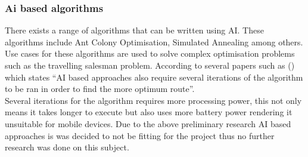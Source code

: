 \subsubsection{Ai based algorithms}
There exists a range of algorithms that can be written using AI. These algorithms include Ant Colony Optimisation, Simulated Annealing among others. Use cases for these algorithms are used to solve complex optimisation problems such as the travelling salesman problem. According to several papers such as (\citetemp \citetemp) which states “AI based approaches also require several iterations of the algorithm to be ran in order to find the more optimum route”.\\
Several iterations for the algorithm requires more processing power, this not only means it takes longer to execute but also uses more battery power rendering it unsuitable for mobile devices. Due to the above preliminary research AI based approaches is was decided to not be fitting for the project thus no further research was done on this subject. 